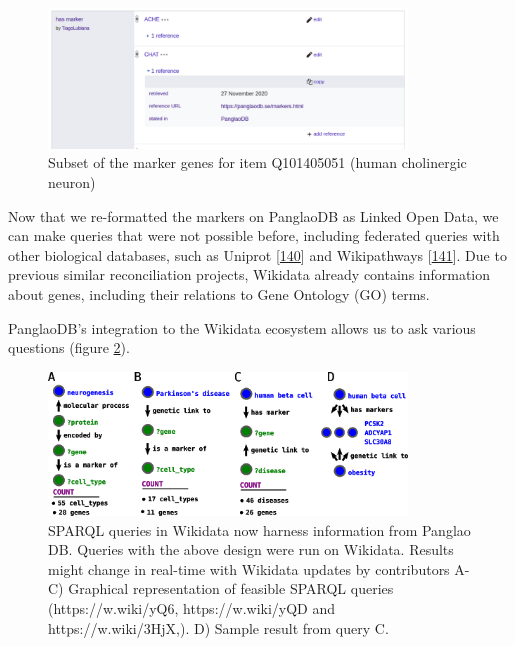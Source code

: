 \begin{figure}
\hypertarget{fig:chat_marker}{%
\centering
\includegraphics[width=0.85\textwidth,height=\textheight]{images/chat_marker.png}
\caption{Subset of the marker genes for item Q101405051 (human cholinergic neuron)}\label{fig:chat_marker}
}
\end{figure}

Now that we re-formatted the markers on PanglaoDB as Linked Open Data, we can make queries that were not possible before, including federated queries with other biological databases, such as Uniprot {[}\protect\hyperlink{ref-HUJ9NzAb}{140}{]}
and Wikipathways {[}\protect\hyperlink{ref-AgOOCR24}{141}{]}.
Due to previous similar reconciliation projects, Wikidata already contains information about genes, including their relations to Gene Ontology (GO) terms.

PanglaoDB's integration to the Wikidata ecosystem allows us to ask various questions (figure \ref{fig:iscb_results}).

\begin{figure}
\hypertarget{fig:iscb_results}{%
\centering
\includegraphics[width=0.85\textwidth,height=\textheight]{images/poster_ISCB_results.png}
\caption{SPARQL queries in Wikidata now harness information from Panglao DB. Queries with the above design were run on Wikidata. Results might change in real-time with Wikidata updates by contributors A-C) Graphical representation of feasible SPARQL queries (https://w.wiki/yQ6, https://w.wiki/yQD and https://w.wiki/3HjX,). D) Sample result from query C.}\label{fig:iscb_results}
}
\end{figure}

